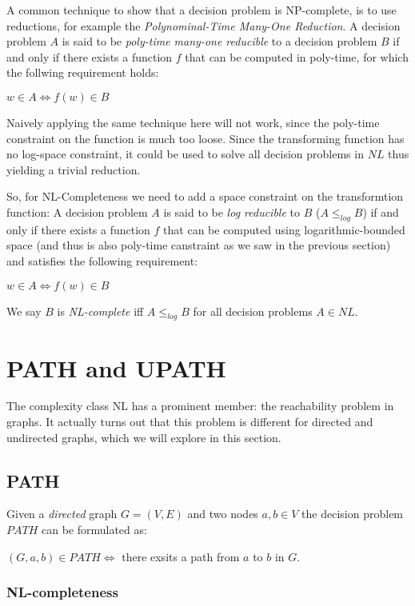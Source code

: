 A common technique to show that a decision problem is NP-complete, is to
use reductions, for example the \emph{Polynominal-Time Many-One
Reduction}. A decision problem $A$ is said to be \emph{poly-time
many-one reducible} to a decision problem $B$ if and only if there
exists a function $f$ that can be computed in poly-time, for which the
follwing requirement holds:

$w \in A \Leftrightarrow f(w) \in B$

Naively applying the same technique here will not work, since the
poly-time constraint on the function is much too loose. Since the
transforming function has no log-space constraint, it could be used to
solve all decision problems in $NL$ thus yielding a trivial reduction.

So, for NL-Completeness we need to add a space constraint on the
transformtion function: A decision problem $A$ is said to be \emph{log
reducible} to $B$ ($A \leq_{log} B$) if and only if there exists a
function $f$ that can be computed using logarithmic-bounded space (and
thus is also poly-time canstraint as we saw in the previous section) and
satisfies the following requirement:

$w \in A \Leftrightarrow f(w) \in B$

We say $B$ is \emph{NL-complete} iff $A \leq_{log} B$ for all decision
problems $A \in NL$.

\chapter{PATH and UPATH}\label{path-and-upath}

The complexity class NL has a prominent member: the reachability problem
in graphs. It actually turns out that this problem is different for
directed and undirected graphs, which we will explore in this section.

\section{PATH}\label{path}

Given a \emph{directed} graph $G = (V, E)$ and two nodes $a, b \in V$
the decision problem $PATH$ can be formulated as:

$(G, a, b) \in PATH \Leftrightarrow $ there exsits a path from $a$ to
$b$ in $G$.

\subsection{NL-completeness}\label{nl-completeness}


